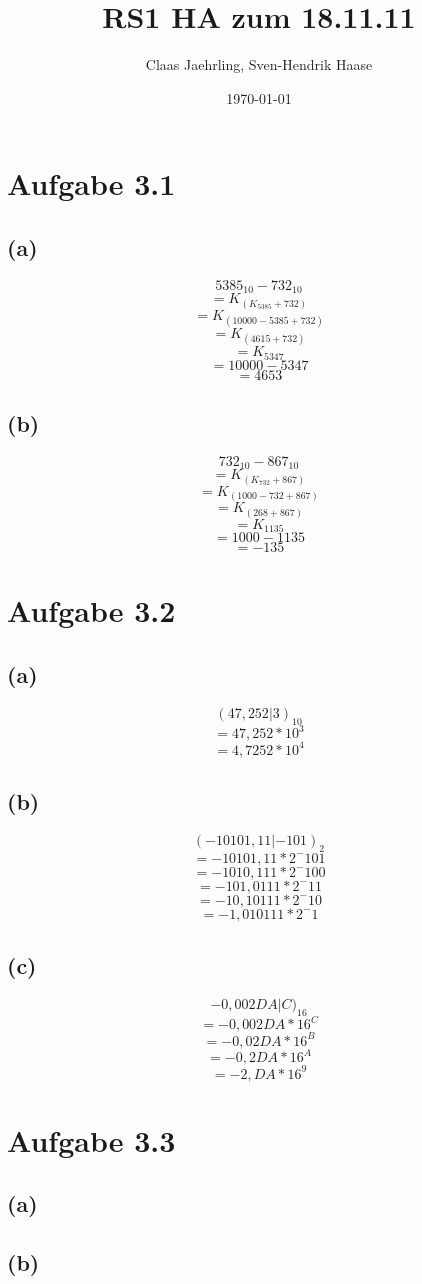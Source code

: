\documentclass[12pt]{article}
\author{Claas Jaehrling, Sven-Hendrik Haase}
\title{RS1 HA zum 18.11.11}
\date{\today}
\begin{document}
\maketitle

\section{Aufgabe 3.1}
\subsection{(a)}
\[5385_{10} - 732_{10}\]
\[= K_(K_5385 + 732)\]
\[= K_(10000-5385 + 732)\]
\[= K_(4615 + 732)\]
\[= K_5347\]
\[= 10000-5347\]
\[= 4653\]
\subsection{(b)}
\[732_{10} - 867_{10}\]
\[= K_(K_732 + 867)\]
\[= K_(1000-732 + 867)\]
\[= K_(268 + 867)\]
\[= K_1135\]
\[= 1000-1135\]
\[= -135\]

\section{Aufgabe 3.2}
\subsection{(a)}
\[(47,252|3)_{10}\]
\[= 47,252 * 10^3\]
\[= 4,7252 * 10^4\]
\subsection{(b)}
\[(-10101,11|-101)_2\]
\[= -10101,11 * 2^-101\]
\[= -1010,111 * 2^-100\]
\[= -101,0111 * 2^-11\]
\[= -10,10111 * 2^-10\]
\[= -1,010111 * 2^-1\]
\subsection{(c)}
\[-0,002DA|C)_{16}\]
\[= -0,002DA * 16^C\]
\[= -0,02DA * 16^B\]
\[= -0,2DA * 16^A\]
\[= -2,DA * 16^9\]

\section{Aufgabe 3.3}
\subsection{(a)}

\subsection{(b)}
\end{document}
